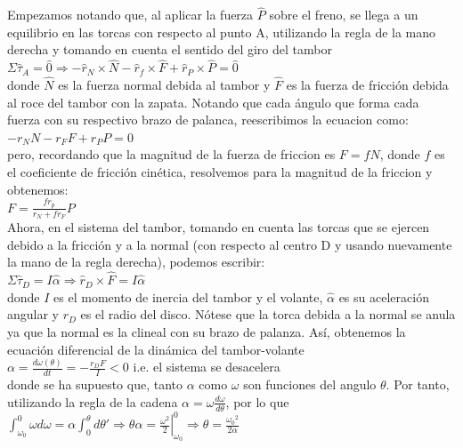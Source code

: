 \documentclass[a4paper,11pt]{scrartcl}
\begin{document}
\begin{center}

Empezamos notando que, al aplicar la fuerza $\hat{P}$ sobre el freno, se llega a un equilibrio en las torcas con respecto al punto A, utilizando la regla de la mano derecha y tomando en cuenta el sentido del giro del tambor\\
\hfill \break
$\Sigma \hat{\tau}_A = \hat{0} \Rightarrow -\hat{r}_N \times \hat{N} - \hat{r}_f \times \hat{F} + \hat{r}_P \times \hat{P} = \hat{0}$\\
\hfill \break
donde $\hat{N}$ es la fuerza normal debida al tambor y $\hat{F}$ es la fuerza de fricción debida al roce del tambor con la zapata. Notando que cada ángulo que forma cada fuerza con su respectivo brazo de palanca, reescribimos la ecuacion como:\\
\hfill \break
$-r_N N - r_F F + r_P P = 0$\\
\hfill \break
pero, recordando que la magnitud de la fuerza de friccion es $F = fN$, donde $f$ es el coeficiente de fricción cinética, resolvemos para la magnitud de la friccion y obtenemos:\\
\hfill \break
$F = \frac{f r_p}{r_N + f r_F} P$\\
\hfill \break
Ahora, en el sistema del tambor, tomando en cuenta las torcas que se ejercen debido a la fricción y a la normal (con respecto al centro D y usando nuevamente la mano de la regla derecha), podemos escribir:\\
\hfill \break
$\Sigma \hat{\tau}_D = I \hat{\alpha} \Rightarrow \hat{r}_D \times \hat{F} = I \hat{\alpha}$\\
\hfill \break
donde $I$ es el momento de inercia del tambor y el volante, $\hat{\alpha}$ es su aceleración angular y $r_D$ es el radio del disco. Nótese que la torca debida a la normal se anula ya que la normal es la clineal con su brazo de palanza. Así, obtenemos la ecuación diferencial de la dinámica del tambor-volante\\
\hfill \break
$\alpha = \frac{d \omega (\theta)}{d t} = - \frac{r_D F}{I} < 0$ i.e. el sistema se desacelera\\
\hfill \break
donde se ha supuesto que, tanto $\alpha$ como $\omega$ son funciones del angulo $\theta$. Por tanto, utilizando la regla de la cadena $\alpha = \omega \frac{d \omega}{d \theta}$, por lo que \\
\hfill \break
$\int_{\omega_0}^{0} \omega d \omega = \alpha \int_{0}^{\theta} d \theta' \Rightarrow \theta \alpha = \left.\frac{\omega^2}{2}\right\vert_{\omega_0}^{0} \Rightarrow \theta = \frac{{\omega_0}^2}{2 \alpha}$\\

\end{center}
\end{document}
